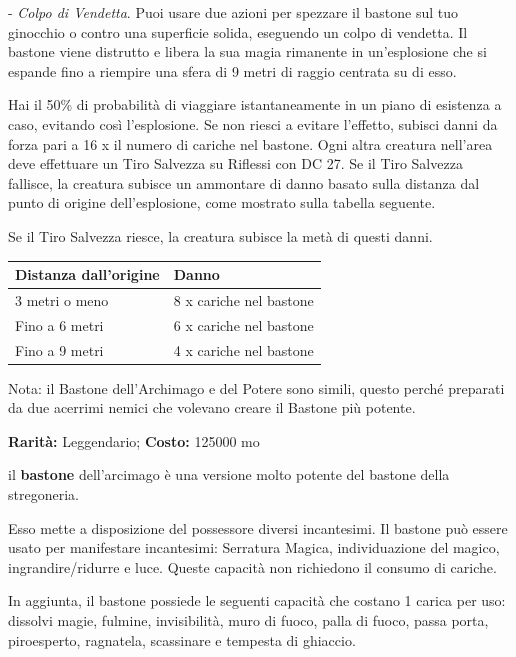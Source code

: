 \begin{multicols}{2}
- \emph{Colpo di Vendetta}. Puoi usare due azioni per spezzare il bastone sul tuo ginocchio o contro una superficie solida, eseguendo un colpo di vendetta. Il bastone viene distrutto e libera la sua magia rimanente in un'esplosione che si espande fino a riempire una sfera di 9 metri di raggio centrata su di esso.

Hai il 50\% di probabilità di viaggiare istantaneamente in un piano di esistenza a caso, evitando così l'esplosione. Se non riesci a evitare l'effetto, subisci danni da forza pari a 16 x il numero di cariche nel bastone. Ogni altra creatura nell'area deve effettuare un Tiro Salvezza su Riflessi con DC 27. Se il Tiro Salvezza fallisce, la creatura subisce un ammontare di danno basato sulla distanza dal punto di origine dell'esplosione, come mostrato sulla tabella seguente.

Se il Tiro Salvezza riesce, la creatura subisce la metà di questi danni.

\medskip

\noindent\begin{tabularx}{0.49\textwidth}{ll}
	\toprule
\rowcolor{gray!20}\textbf{Distanza dall'origine} &\textbf{Danno}\\
\toprule
3 metri o meno &8 x cariche nel bastone\\
\rowcolor{gray!20}Fino a 6 metri& 6 x cariche nel bastone\\
Fino a 9 metri& 4 x cariche nel bastone
\end{tabularx}

\medskip

Nota: il Bastone dell'Archimago e del Potere sono simili, questo perché preparati da due acerrimi nemici che volevano creare il Bastone più potente.


\textbf{Rarità:} Leggendario; \textbf{Costo:} 125000 mo

il \textbf{bastone} dell'arcimago è una versione molto potente del bastone della stregoneria.

Esso mette a disposizione del possessore diversi incantesimi. Il bastone può essere usato per manifestare incantesimi: Serratura Magica, individuazione del magico, ingrandire/ridurre e luce. Queste capacità non richiedono il consumo di cariche.

In aggiunta, il bastone possiede le seguenti capacità che costano 1 carica per uso: dissolvi magie, fulmine, invisibilità, muro di fuoco, palla di fuoco, passa porta, piroesperto, ragnatela, scassinare e tempesta di ghiaccio.


\end{multicols}
